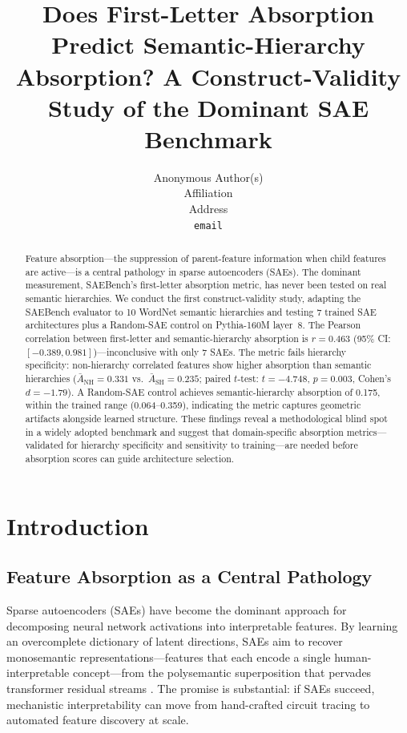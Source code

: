 \documentclass{article}
\title{Does First-Letter Absorption Predict Semantic-Hierarchy Absorption? A Construct-Validity Study of the Dominant SAE Benchmark}
\author{%
  Anonymous Author(s) \\
  Affiliation \\
  Address \\
  \texttt{email} \\
}
\begin{document}
\maketitle

\begin{abstract}
Feature absorption---the suppression of parent-feature information when child features are active---is a central pathology in sparse autoencoders (SAEs). The dominant measurement, SAEBench's first-letter absorption metric, has never been tested on real semantic hierarchies. We conduct the first construct-validity study, adapting the SAEBench evaluator to 10 WordNet semantic hierarchies and testing 7 trained SAE architectures plus a Random-SAE control on Pythia-160M layer~8. The Pearson correlation between first-letter and semantic-hierarchy absorption is $r = 0.463$ (95\% CI: $[-0.389, 0.981]$)---inconclusive with only 7 SAEs. The metric fails hierarchy specificity: non-hierarchy correlated features show higher absorption than semantic hierarchies ($\bar{A}_{\text{NH}} = 0.331$ vs.~$\bar{A}_{\text{SH}} = 0.235$; paired $t$-test: $t = -4.748$, $p = 0.003$, Cohen's $d = -1.79$). A Random-SAE control achieves semantic-hierarchy absorption of 0.175, within the trained range (0.064--0.359), indicating the metric captures geometric artifacts alongside learned structure. These findings reveal a methodological blind spot in a widely adopted benchmark and suggest that domain-specific absorption metrics---validated for hierarchy specificity and sensitivity to training---are needed before absorption scores can guide architecture selection.
\end{abstract}

\section{Introduction}

\subsection{Feature Absorption as a Central Pathology}

Sparse autoencoders (SAEs) have become the dominant approach for decomposing neural network activations into interpretable features. By learning an overcomplete dictionary of latent directions, SAEs aim to recover monosemantic representations---features that each encode a single human-interpretable concept---from the polysemantic superposition that pervades transformer residual streams \citep{bricken2023monosemanticity,cunningham2023sparse}. The promise is substantial: if SAEs succeed, mechanistic interpretability can move from hand-crafted circuit tracing to automated feature discovery at scale.
\end{document}

